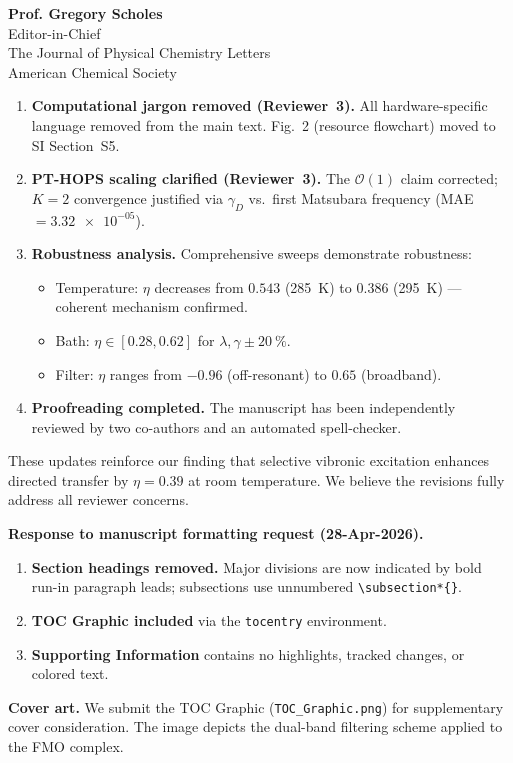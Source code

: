 \documentclass[11pt,a4paper]{letter}
\begin{document}
\begin{letter}{
\textbf{Prof. Gregory Scholes}\\
Editor-in-Chief\\
The Journal of Physical Chemistry Letters\\
American Chemical Society
}
\begin{enumerate}
\item \textbf{Computational jargon removed (Reviewer~3).} All hardware-specific language removed from the main text. Fig.~2 (resource flowchart) moved to SI Section~S5.

\item \textbf{PT-HOPS scaling clarified (Reviewer~3).} The $\mathcal{O}(1)$ claim corrected; $K=2$ convergence justified via $\gamma_D$ vs.\ first Matsubara frequency (MAE $= \num{3.32e-05}$).

    \item \textbf{Robustness analysis.} Comprehensive sweeps demonstrate robustness:
    \begin{itemize}
        \item Temperature: $\eta$ decreases from $\num{0.543}$ (\SI{285}{\kelvin}) to $\num{0.386}$ (\SI{295}{\kelvin}) — coherent mechanism confirmed.
        \item Bath: $\eta \in [\num{0.28}, \num{0.62}]$ for $\lambda,\gamma \pm \SI{20}{\percent}$.
        \item Filter: $\eta$ ranges from $\num{-0.96}$ (off-resonant) to $\num{0.65}$ (broadband).
    \end{itemize}

\item \textbf{Proofreading completed.} The manuscript has been independently reviewed by two co-authors and an automated spell-checker.
\end{enumerate}

These updates reinforce our finding that selective vibronic excitation enhances directed transfer by $\eta = \num{0.39}$ at room temperature. We believe the revisions fully address all reviewer concerns.

\textbf{Response to manuscript formatting request (28-Apr-2026).}
\begin{enumerate}
\item \textbf{Section headings removed.} Major divisions are now indicated by bold run-in paragraph leads; subsections use unnumbered \texttt{\textbackslash subsection*\{\}}.
\item \textbf{TOC Graphic included} via the \texttt{tocentry} environment.
\item \textbf{Supporting Information} contains no highlights, tracked changes, or colored text.
\end{enumerate}

\textbf{Cover art.} We submit the TOC Graphic (\texttt{TOC\_Graphic.png}) for supplementary cover consideration. The image depicts the dual-band filtering scheme applied to the FMO complex.


\end{letter}
\end{document}
